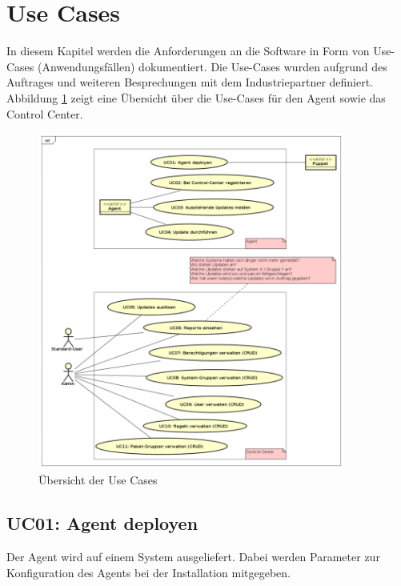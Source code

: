 \section{Use Cases}

In diesem Kapitel werden die Anforderungen an die Software in Form von Use-Cases (Anwendungsfällen) dokumentiert. Die Use-Cases wurden aufgrund des Auftrages und weiteren Besprechungen mit dem Industriepartner definiert. Abbildung \ref{fig:usecases} zeigt eine Übersicht über die Use-Cases für den Agent sowie das Control Center.

\begin{figure}
  \centering
    \includegraphics[width=0.9\textwidth]{files/UseCases_small}
  \caption{Übersicht der Use Cases}
  \label{fig:usecases}
\end{figure}


\subsection*{UC01: Agent deployen}
\label{sec:uc_01}

Der Agent wird auf einem System ausgeliefert. Dabei werden Parameter zur Konfiguration des Agents bei der Installation mitgegeben.


